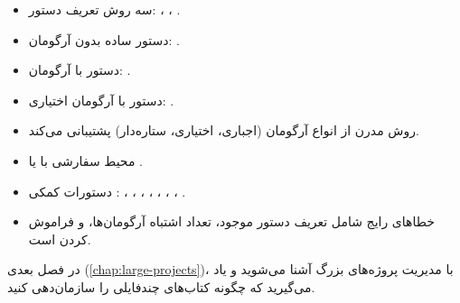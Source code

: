 \begin{itemize}
    \item سه روش تعریف دستور:
    ، ،
    .

    \item دستور ساده بدون آرگومان:
    .

    \item دستور با آرگومان:
    .

    \item دستور با آرگومان اختیاری:
    .

    \item روش مدرن  از انواع آرگومان
    (اجباری، اختیاری، ستاره‌دار) پشتیبانی
    می‌کند.

    \item محیط سفارشی با 
    یا .

    \item دستورات کمکی :
    ، ، ،
    ، ، ،
    ، .

    \item خطاهای رایج شامل تعریف دستور موجود،
    تعداد اشتباه آرگومان‌ها، و فراموش کردن
     است.
\end{itemize}

در فصل بعدی (\cref{chap:large-projects})،
با مدیریت پروژه‌های بزرگ آشنا می‌شوید و
یاد می‌گیرید که چگونه کتاب‌های چندفایلی
را سازمان‌دهی کنید.